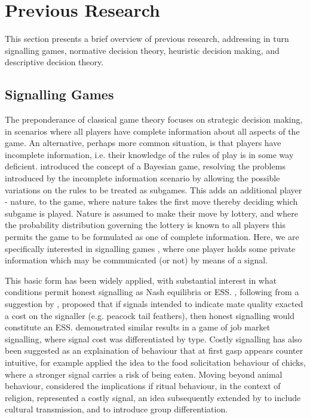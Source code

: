 \section{Previous Research}

\label{sec:lit_review}

This section presents a brief overview of previous research, addressing in turn signalling games, normative decision theory, heuristic decision making, and descriptive decision theory.


\subsection{Signalling Games}

The preponderance of classical game theory focuses on strategic decision making, in scenarios where all players have complete information about all aspects of the game. An alternative, perhaps more common situation, is that players have incomplete information, i.e. their knowledge of the rules of play is in some way deficient. \citet{Harsanyi1967} introduced the concept of a Bayesian game, resolving the problems introduced by the incomplete information scenario by allowing the possible variations on the rules to be treated as subgames. This adds an additional player - nature, to the game, where nature takes the first move thereby deciding which subgame is played. Nature is assumed to make their move by lottery, and where the probability distribution governing the lottery is known to all players this permits the game to be formulated as one of complete information. Here, we are specifically interested in signalling games \citep{Kreps1987,Spence1973}, where one player holds some private information which may be communicated (or not) by means of a signal.

This basic form has been widely applied, with substantial interest in what conditions permit honest signalling as Nash equilibria or \ac{ESS}. \citet{Grafen1990}, following from a suggestion by \citet{Zahavi1975}, proposed that if signals intended to indicate mate quality exacted a cost on the signaller (e.g. peacock tail feathers), then honest signalling would constitute an \ac{ESS}. \citet{Spence1973} demonstrated similar results in a game of job market signalling, where signal cost was differentiated by type. Costly signalling has also been suggested as an explaination of behaviour that at first gasp appears counter intuitive, for example \citet{Godfray1991} applied the idea to the food solicitation behaviour of chicks, where a stronger signal carries a risk of being eaten. Moving beyond animal behaviour, \citet{Sosis2003} considered the implications if ritual behaviour, in the context of religion, represented a costly signal, an idea subsequently extended by \citet{Henrich2009} to include cultural transmission, and \citet{Wildman2011} to introduce group differentiation.

